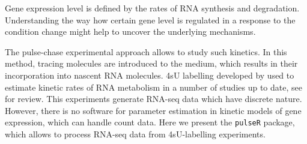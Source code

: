 Gene expression level is defined by the rates of RNA synthesis and degradation.
Understanding the way how certain gene level is regulated in a response to
the condition change might help to uncover the underlying mechanisms.
\par
The pulse-chase experimental approach allows to study such kinetics. 
 In this method, tracing molecules are introduced to the medium, 
 which results in their incorporation into nascent RNA molecules.
4sU labelling developed by \citep{dolken2008high} used to estimate 
kinetic rates of RNA metabolism in a number of studies up to date, 
see \citep{wachutka2016measures} for review.
This experiments generate  RNA-seq data which have discrete nature.
However, there is no software for  parameter
estimation in kinetic models of gene expression, which can handle 
count data. Here we present the \verb|pulseR| package, which allows to 
process RNA-seq data from 4sU-labelling experiments.
